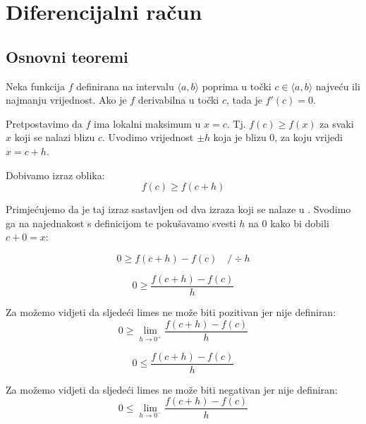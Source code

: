 \section{Diferencijalni račun}

\subsection{Osnovni teoremi}

\begin{theorembox}
    Neka funkcija $f$ definirana na intervalu $\langle a,b \rangle$ poprima u
    točki $c\in\langle a,b \rangle$ najveću ili najmanju vrijednost. Ako je $f$
    derivabilna u točki $c$, tada je $f'(c)=0$.
\end{theorembox}


Pretpostavimo da $f$ ima lokalni maksimum u $x=c$. Tj. $f(c)\geq f(x)$ za svaki
$x$ koji se nalazi blizu $c$.
Uvodimo vrijednost $\pm h$ koja je blizu $0$, za koju
vrijedi $x = c+h$.

Dobivamo izraz oblika:
$$
f(c)\geq f(c+h)
$$

Primjećujemo da je taj izraz sastavljen od dva izraza koji se nalaze u
.
Svodimo ga na najednakost s definicijom te pokušavamo svesti $h$ na $0$ kako bi
dobili $c+0=x$:

$$
0 \geq f(c+h) - f(c)\quad /\div h
$$

\begin{multicols}{2}
\begin{equation}
\label{eq:fermat_h_gt_zero}
0\geq\frac{f(c+h)-f(c)}{h}\tag{$h>0$}
\end{equation}

\noindent
Za  možemo vidjeti da sljedeći limes ne može
biti pozitivan jer nije definiran:
$$
    0\geq \lim_{h\to 0^+}\frac{f(c+h)-f(c)}{h}
$$

\newcolumn

\begin{equation}
\label{eq:fermat_h_lt_zero}
0\leq\frac{f(c+h)-f(c)}{h}\tag{$h<0$}
\end{equation}

\noindent
Za  možemo vidjeti da sljedeći limes ne može
biti negativan jer nije definiran:
$$
    0\leq \lim_{h\to 0^-}\frac{f(c+h)-f(c)}{h}
$$

\end{multicols}

